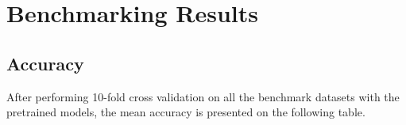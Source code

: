 \documentclass[class=report, crop=false, a4paper, 12pt]{standalone}
\begin{document}
\section{Benchmarking Results}
\subsection{Accuracy}

\par After performing 10-fold cross validation on all the benchmark datasets with the pretrained models, the mean accuracy is presented on the following table.

 

\begin{table}[H]
    \centering
    \caption{Model's face verification accuracy.}
    \label{tab:acc}
\end{table}
\end{document}
